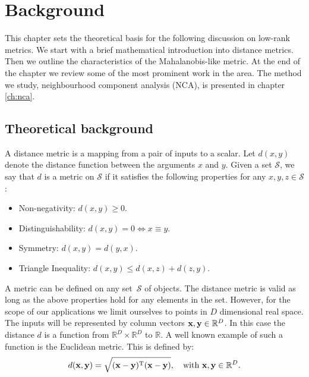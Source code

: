 \chapter{Background}

This chapter sets the theoretical basis for the following discussion on low-rank metrics. We start with a brief mathematical introduction into distance metrics. Then we outline the characteristics of the Mahalanobis-like metric. At the end of the chapter we review some of the most prominent work in the area. The method we study, neighbourhood component analysis (NCA), is presented in chapter \ref{ch:nca}.

\section{Theoretical background}
\label{sec:theoretical-background}
  A distance metric is a mapping from a pair of inputs to a scalar. Let $d(x,y)$ denote the distance function between the arguments $x$ and $y$. Given a set $\mathcal{S}$, we say that $d$ is a metric on $\mathcal{S}$ if it satisfies the following properties for any $x,y,z\in\mathcal{S}$:
	\begin{itemize}
		\item Non-negativity: $d(x,y) \ge 0$.
		\item Distinguishability: $d(x,y)=0 \Leftrightarrow  x\equiv y$.
		\item Symmetry: $d(x,y)=d(y,x)$.
		\item Triangle Inequality: $d(x,y)\leq d(x,z) + d(z,y)$.
	\end{itemize}
	
	A metric can be defined on any set~$\mathcal{S}$ of objects. The distance metric is valid as long as the above properties hold for any elements in the set. However, for the scope of our applications we limit ourselves to points in $D$ dimensional real space. The inputs will be represented by column vectors $\mathbf{x},\mathbf{y} \in \mathbb{R}^D$. In this case the distance $d$ is a function from $\mathbb{R}^D\times\mathbb{R}^D$ to $\mathbb{R}$. A well known example of such a function is the Euclidean metric. This is defined by:
	\begin{align}
		 d(\mathbf{x},\mathbf{y}) = \sqrt{(\mathbf{x-y})^\textrm{T}(\mathbf{x-y})}, \quad\mbox{with }\mathbf{x,y}\in \mathbb{R}^D.
	\end{align}
	
